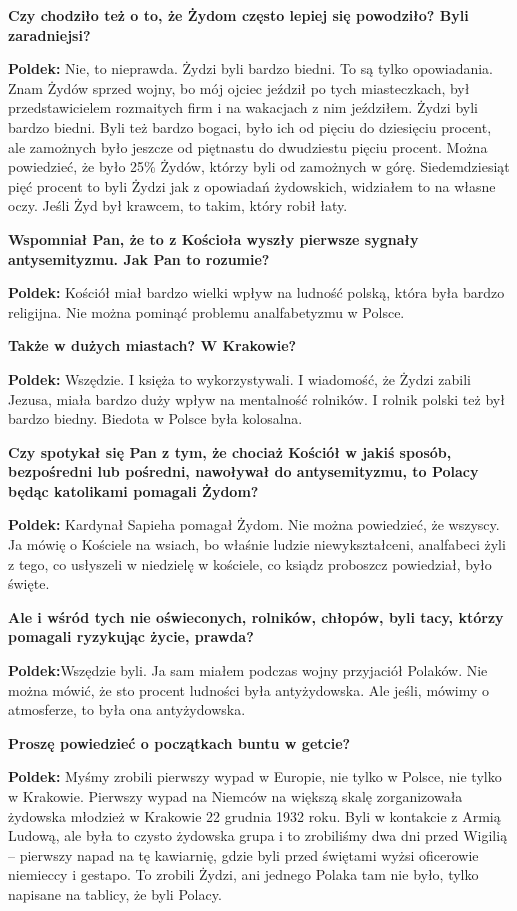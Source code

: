 \textbf{Czy chodziło też o to, że Żydom często lepiej się powodziło? Byli zaradniejsi?}\par 
\textbf{Poldek:} Nie, to nieprawda. Żydzi byli bardzo biedni. To są tylko opowiadania. Znam Żydów sprzed wojny, bo mój ojciec jeździł po tych miasteczkach, był przedstawicielem rozmaitych firm i na wakacjach z nim jeździłem. Żydzi byli bardzo biedni. Byli też bardzo bogaci, było ich od pięciu do dziesięciu procent, ale zamożnych było jeszcze od piętnastu do dwudziestu pięciu procent. Można powiedzieć, że było 25\% Żydów, którzy byli od zamożnych w górę. Siedemdziesiąt pięć procent to byli Żydzi jak z opowiadań żydowskich, widziałem to na własne oczy. Jeśli Żyd był krawcem, to takim, który robił łaty.\par
\textbf{Wspomniał Pan, że to z Kościoła wyszły pierwsze sygnały antysemityzmu. Jak Pan to rozumie?}\par 
\textbf{Poldek:} Kościół miał bardzo wielki wpływ na ludność polską, która była bardzo religijna. Nie można pominąć problemu analfabetyzmu w Polsce.\par
\textbf{Także w dużych miastach? W Krakowie?}\par
\textbf{Poldek:} Wszędzie. I księża to wykorzystywali. I wiadomość, że Żydzi zabili Jezusa, miała bardzo duży wpływ na mentalność rolników. I rolnik polski też był bardzo biedny. Biedota w Polsce była kolosalna.\par  
\textbf{Czy spotykał się Pan z tym, że chociaż Kościół w jakiś sposób, bezpośredni lub pośredni, nawoływał do antysemityzmu, to Polacy będąc katolikami pomagali Żydom?}\par
\textbf{Poldek:} Kardynał Sapieha pomagał Żydom. Nie można powiedzieć, że wszyscy. Ja mówię o Kościele na wsiach, bo właśnie ludzie niewykształceni, analfabeci żyli z tego, co usłyszeli w niedzielę w kościele, co ksiądz proboszcz powiedział, było święte.\par
\textbf{Ale i wśród tych nie oświeconych, rolników, chłopów, byli tacy, którzy pomagali ryzykując życie, prawda?}\par 
\textbf{Poldek:}Wszędzie byli. Ja sam miałem podczas wojny przyjaciół Polaków. Nie można mówić, że sto procent ludności była antyżydowska. Ale jeśli, mówimy o atmosferze, to była ona antyżydowska.\par
\textbf{Proszę powiedzieć o początkach buntu w getcie?}\par 
\textbf{Poldek:} Myśmy zrobili pierwszy wypad w Europie, nie tylko w Polsce, nie tylko w Krakowie. Pierwszy wypad na Niemców na większą skalę zorganizowała żydowska młodzież w Krakowie 22 grudnia 1932 roku. Byli w kontakcie z Armią Ludową, ale była to czysto żydowska grupa i to zrobiliśmy dwa dni przed Wigilią – pierwszy napad na tę kawiarnię, gdzie byli przed świętami wyżsi oficerowie niemieccy i gestapo. To zrobili Żydzi, ani jednego Polaka tam nie było, tylko napisane na tablicy, że byli Polacy.\par 
